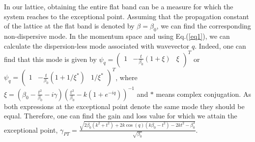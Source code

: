 \documentclass[aps,prl,twocolumn,showpacs,groupedaddress,amsmath,amssymb]{revtex4}
\begin{document}
In our lattice, obtaining the entire flat band can be a measure for which the system reaches to the exceptional point. Assuming that the propagation constant of the lattice at the flat band is denoted by $\beta=\beta_0$, we can find the corresponding non-dispersive mode. In the momentum space and using Eq.(\ref{eq1}), we can calculate the dispersion-less mode associated with wavevector $q$. Indeed, one can find that this mode is given by $ \psi_q=\left(
\begin{array}{ccc}
1&-\frac{t}{\beta_0}(1+\xi)&\xi
\end{array}
\right)^T$ 
or 
$ \psi_q=\left(
\begin{array}{ccc}
1&-\frac{t}{\beta_0}(1+1/\xi^\ast)&1/{\xi^ \ast}
\end{array}
\right)^T$, 
where $\xi=(\beta_0-\frac{t^2}{\beta_0}-i\gamma)(\frac{t^2}{\beta_0}-k(1+e^{-iq}))^{-1}$ and $\ast$ means complex conjugation. As both expressions at the exceptional point denote the same mode they should be equal. Therefore, one can find the gain and loss value for which we attain the exceptional point, $\gamma_{PT}=\frac{\sqrt{2 \beta_0  \left(k^2+t^2\right)+2 k \cos (q) \left(k \beta_0 -t^2\right)-2 k t^2-\beta_0 ^3}}{\sqrt{\beta_0 }}$.
\end{document}
